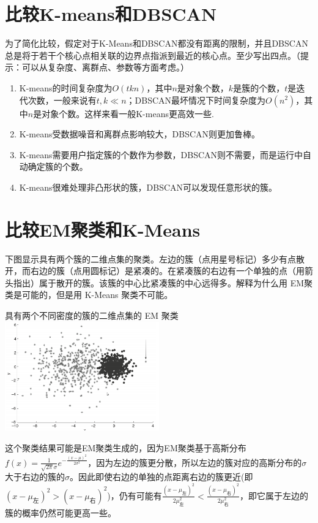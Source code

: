 \documentclass[12pt, UTF8]{article}
\begin{document}
\section{比较K-means和DBSCAN}

为了简化比较，假定对于K-Means和DBSCAN都没有距离的限制，并且DBSCAN总是将于若干个核心点相关联的边界点指派到最近的核心点。至少写出四点。（提示：可以从复杂度、离群点、参数等方面考虑。）

\begin{enumerate}
  \item K-means的时间复杂度为$O(tkn)$，其中$n$是对象个数，$k$是簇的个数，$t$是迭代次数，一般来说有$t, k \ll n$；DBSCAN最坏情况下时间复杂度为$O(n^2)$，其中$n$是对象个数。这样来看一般K-means更高效一些.
  \item K-means受数据噪音和离群点影响较大，DBSCAN则更加鲁棒。
  \item K-means需要用户指定簇的个数作为参数，DBSCAN则不需要，而是运行中自动确定簇的个数。
  \item K-means很难处理非凸形状的簇，DBSCAN可以发现任意形状的簇。
\end{enumerate}

\section{比较EM聚类和K-Means}

下图显示具有两个簇的二维点集的聚类。左边的簇（点用星号标记）多少有点散开，而右边的簇（点用圆标记）是紧凑的。在紧凑簇的右边有一个单独的点（用箭头指出）属于散开的簇。该簇的中心比紧凑簇的中心远得多。解释为什么用 EM聚类是可能的，但是用 K-Means 聚类不可能。

\begin{center}
  具有两个不同密度的簇的二维点集的 EM 聚类 \\
  \includegraphics[width=0.5\textwidth]{t4.png}
\end{center}

这个聚类结果可能是EM聚类生成的，因为EM聚类基于高斯分布$f(x) = \frac{1}{\sqrt{2\pi}\sigma}e^{-\frac{(x-\mu)^2}{2\sigma^2}}$，因为左边的簇更分散，所以左边的簇对应的高斯分布的$\sigma$大于右边的簇的$\sigma$。因此即使右边的单独的点距离右边的簇更近(即$(x-\mu_{\text{左}})^2 > (x-\mu_{\text{右}})^2$)，仍有可能有$\frac{(x-\mu_{\text{左}})^2}{2\mu_{\text{左}}^2} < \frac{(x-\mu_{\text{右}})^2}{2\mu_{\text{右}}^2}$，即它属于左边的簇的概率仍然可能更高一些。
\end{document}
